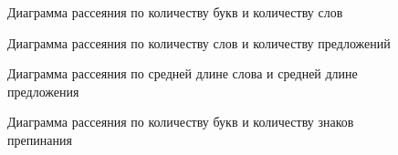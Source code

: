 \documentclass[%
bachelor,    %
subf,        %
href,        %
colorlinks,  %
]{disser}
\begin{document}
\begin{figure}
	\centering		
	
	\caption{Диаграмма рассеяния по количеству букв и количеству слов}
	\label{fig:scatter_1}
\end{figure}
\begin{figure}
	\centering		
	
	\caption{Диаграмма рассеяния по количеству слов и количеству предложений}
	\label{fig:scatter_2}
\end{figure}
\begin{figure}
	\centering		
	
	\caption{Диаграмма рассеяния по средней длине слова и средней длине предложения }
	\label{fig:scatter_3}
\end{figure}
\begin{figure}
	\centering		
	
	\caption{Диаграмма рассеяния по количеству букв и количеству знаков препинания }
	\label{fig:scatter_4}
\end{figure}
\newpage
\end{document}
